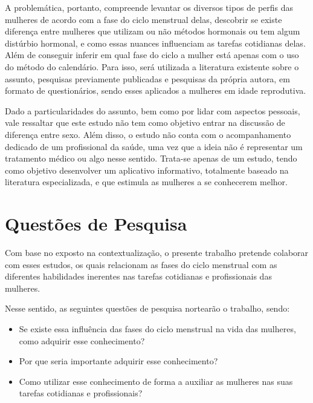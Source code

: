 A problemática, portanto, compreende levantar os diversos tipos de perfis das mulheres de acordo com a 
fase do ciclo menstrual delas, descobrir se existe diferença entre mulheres que utilizam ou não métodos 
hormonais ou tem algum distúrbio hormonal, e como essas nuances influenciam as tarefas cotidianas delas. 
Além de conseguir inferir em qual fase do ciclo a mulher está apenas com o uso do método do calendário. 
Para isso, será utilizada a literatura existente sobre o assunto, pesquisas previamente publicadas e 
pesquisas da própria autora, em formato de questionários, sendo esses aplicados a mulheres em idade 
reprodutiva.


Dado a particularidades do assunto, bem como por lidar com aspectos pessoais, vale ressaltar que este 
estudo não tem como objetivo entrar na discussão de diferença entre sexo. Além disso, o estudo não 
conta com o acompanhamento dedicado de um profissional da saúde, uma vez que a ideia não é representar 
um tratamento médico ou algo nesse sentido. Trata-se apenas de um estudo, tendo como objetivo desenvolver 
um aplicativo informativo, totalmente baseado na literatura especializada, e que estimula as mulheres a 
se conhecerem melhor. 


\section{Questões de Pesquisa}

Com base no exposto na contextualização, o presente trabalho pretende colaborar com esses estudos, 
os quais relacionam as fases do ciclo menstrual com as diferentes habilidades inerentes nas tarefas 
cotidianas e profissionais das mulheres.

Nesse sentido, as seguintes questões de pesquisa nortearão o trabalho, sendo:

\begin{itemize}

        \item Se existe essa influência das fases do ciclo menstrual na vida das mulheres, como adquirir esse conhecimento?

        \item Por que seria importante adquirir esse conhecimento? 

        \item Como utilizar esse conhecimento de forma a auxiliar as mulheres nas suas tarefas cotidianas e profissionais?

\end{itemize}

